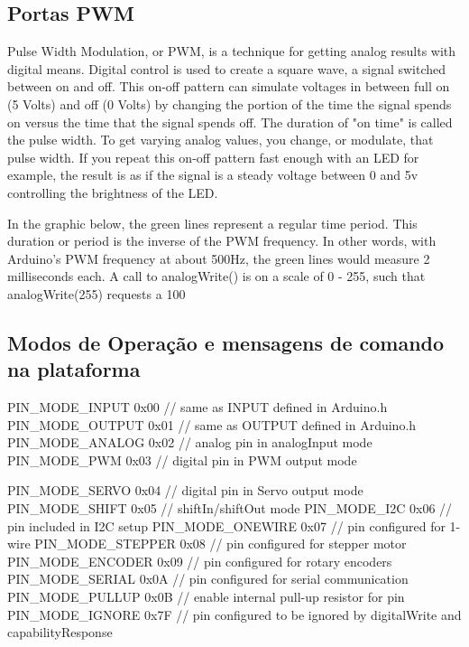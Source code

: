 \subsection{Portas PWM}
Pulse Width Modulation, or PWM, is a technique for getting analog results with digital means. Digital control is used to create a square wave, a signal switched between on and off. This on-off pattern can simulate voltages in between full on (5 Volts) and off (0 Volts) by changing the portion of the time the signal spends on versus the time that the signal spends off. The duration of "on time" is called the pulse width. To get varying analog values, you change, or modulate, that pulse width. If you repeat this on-off pattern fast enough with an LED for example, the result is as if the signal is a steady voltage between 0 and 5v controlling the brightness of the LED.

In the graphic below, the green lines represent a regular time period. This duration or period is the inverse of the PWM frequency. In other words, with Arduino's PWM frequency at about 500Hz, the green lines would measure 2 milliseconds each. A call to analogWrite() is on a scale of 0 - 255, such that analogWrite(255) requests a 100%
	 
\subsection{Modos de Operação e mensagens de comando na plataforma}


PIN_MODE_INPUT          0x00 // same as INPUT defined in Arduino.h
PIN_MODE_OUTPUT         0x01 // same as OUTPUT defined in Arduino.h
PIN_MODE_ANALOG         0x02 // analog pin in analogInput mode
PIN_MODE_PWM            0x03 // digital pin in PWM output mode

PIN_MODE_SERVO          0x04 // digital pin in Servo output mode
PIN_MODE_SHIFT          0x05 // shiftIn/shiftOut mode
PIN_MODE_I2C            0x06 // pin included in I2C setup
PIN_MODE_ONEWIRE        0x07 // pin configured for 1-wire
PIN_MODE_STEPPER        0x08 // pin configured for stepper motor
PIN_MODE_ENCODER        0x09 // pin configured for rotary encoders
PIN_MODE_SERIAL         0x0A // pin configured for serial communication
PIN_MODE_PULLUP         0x0B // enable internal pull-up resistor for pin
PIN_MODE_IGNORE         0x7F // pin configured to be ignored by digitalWrite and capabilityResponse


